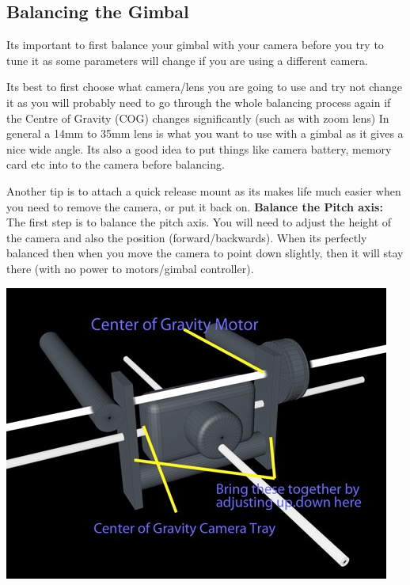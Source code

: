 \documentclass[11pt,a4paper]{article}
\begin{document}
		\newpage
		\subsection{Balancing the Gimbal}
		Its important to first balance your gimbal with your camera before you try to tune it as some parameters will change if you are using a different camera.
		\par Its best to first choose what camera/lens you are going to use and try not change it as you will probably need to go through the whole balancing process again if the Centre of Gravity (COG) changes significantly (such as with zoom lens) In general a 14mm to 35mm lens is what you want to use with a gimbal as it gives a nice wide angle. Its also a good idea to put things like camera battery, memory card etc into to the camera before balancing.
		\par Another tip is to attach a quick release mount as its makes life much easier when you need to remove the camera, or put it back on.
		\newline
		\newline
		\textbf{Balance the Pitch axis:}
		\newline
		The first step is to balance the pitch axis. You will need to adjust the height of the camera and also the position (forward/backwards). When its perfectly balanced then when you move the camera to point down slightly, then it will stay there (with no power to motors/gimbal controller).
		\newline
		\begin{center}
			\includegraphics[scale=1.8]{balancing_pitch_1.jpg}
		\end{center}
\end{document}
